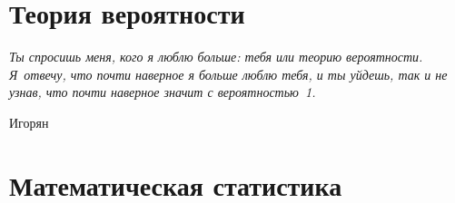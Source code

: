 \documentclass[12pt]{article}
\numberwithin{Th}{section}
\numberwithin{Def}{section}
\numberwithin{Lem}{section}
\numberwithin{St}{section}
\numberwithin{equation}{section}
\begin{document}
\tableofcontents
\newpage

\part{Теория вероятности}

\hfill\parbox{0.5\linewidth}{
\textit{Ты спросишь меня, кого я люблю больше: тебя или теорию вероятности. Я~отвечу, что почти наверное я больше люблю тебя, и ты уйдешь, так и не узнав, что почти наверное значит с вероятностью~1.}
\begin{flushright}
    Игорян
\end{flushright} 
}
\newpage








































\part{Математическая статистика}
\end{document}
